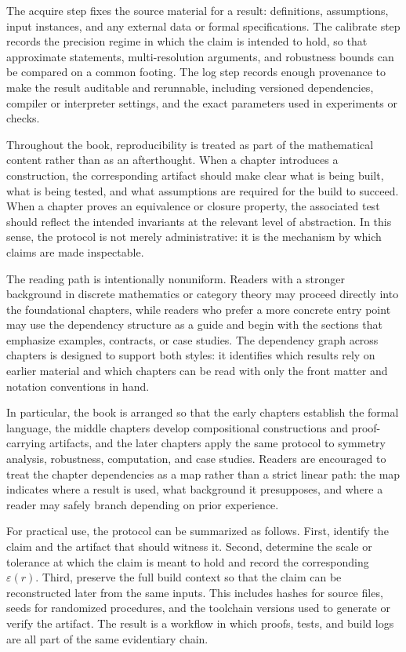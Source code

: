 \documentclass[11pt]{article}
\begin{document}
The acquire step fixes the source material for a result: definitions, assumptions, input instances, and any external data or formal specifications. The calibrate step records the precision regime in which the claim is intended to hold, so that approximate statements, multi-resolution arguments, and robustness bounds can be compared on a common footing. The log step records enough provenance to make the result auditable and rerunnable, including versioned dependencies, compiler or interpreter settings, and the exact parameters used in experiments or checks.

Throughout the book, reproducibility is treated as part of the mathematical content rather than as an afterthought. When a chapter introduces a construction, the corresponding artifact should make clear what is being built, what is being tested, and what assumptions are required for the build to succeed. When a chapter proves an equivalence or closure property, the associated test should reflect the intended invariants at the relevant level of abstraction. In this sense, the protocol is not merely administrative: it is the mechanism by which claims are made inspectable.

The reading path is intentionally nonuniform. Readers with a stronger background in discrete mathematics or category theory may proceed directly into the foundational chapters, while readers who prefer a more concrete entry point may use the dependency structure as a guide and begin with the sections that emphasize examples, contracts, or case studies. The dependency graph across chapters is designed to support both styles: it identifies which results rely on earlier material and which chapters can be read with only the front matter and notation conventions in hand.

In particular, the book is arranged so that the early chapters establish the formal language, the middle chapters develop compositional constructions and proof-carrying artifacts, and the later chapters apply the same protocol to symmetry analysis, robustness, computation, and case studies. Readers are encouraged to treat the chapter dependencies as a map rather than a strict linear path: the map indicates where a result is used, what background it presupposes, and where a reader may safely branch depending on prior experience.

For practical use, the protocol can be summarized as follows. First, identify the claim and the artifact that should witness it. Second, determine the scale or tolerance at which the claim is meant to hold and record the corresponding \(\varepsilon(r)\). Third, preserve the full build context so that the claim can be reconstructed later from the same inputs. This includes hashes for source files, seeds for randomized procedures, and the toolchain versions used to generate or verify the artifact. The result is a workflow in which proofs, tests, and build logs are all part of the same evidentiary chain.
\end{document}
